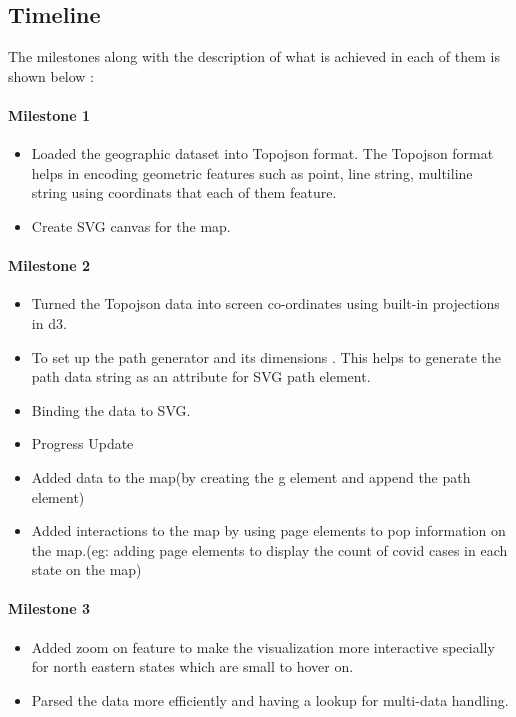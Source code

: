 \subsection{Timeline}
\label{sec:timeline}

The milestones along with the description of what is achieved in each of them is shown below :

\paragraph{Milestone 1}
\begin{itemize}
\item Loaded the geographic dataset into Topojson format. The Topojson format helps in encoding geometric features such as point, line string, multiline string using coordinats that each of them feature.
\item Create SVG canvas for the map.
\end{itemize}

\paragraph{Milestone 2}

\begin{itemize}
\item Turned the Topojson data into screen co-ordinates using built-in projections in d3\cite{proj}.
\item To set up the path generator and its dimensions \cite{geoPath}.  This helps to generate the path data string as an attribute for SVG path element.
 \item Binding the data to SVG.
\item Progress Update
\item Added data to the map(by creating the g element and append the path element)
\item Added interactions to the map by using page elements to pop information on the map.(eg: adding page elements to display the count of covid cases in each state on the map)
\end{itemize}

\paragraph{Milestone 3}
\begin{itemize}
\item Added zoom on feature to make the visualization more interactive specially for north eastern states which are small to hover on.
\item Parsed the data more efficiently and having a lookup for multi-data handling.
\end{itemize}


